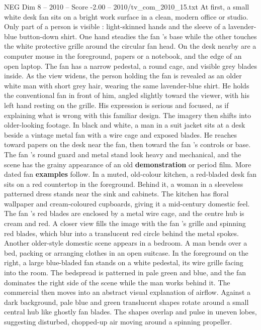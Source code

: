\begin{textsample}{NEG Dim 8 – 2010 – Score -2.00 – 2010/tv\_com\_2010\_15.txt}  \label{ex:f8_neg_075}
At first, a small white desk fan sits on a bright work surface in a clean, modern office or studio.
Only part of a person is visible : light-skinned hands and the sleeve of a lavender-blue button-down shirt.
One hand steadies the fan ’s base while the other touches the white protective grille around the circular fan head.
On the desk nearby are a computer mouse in the foreground, papers or a notebook, and the edge of an open laptop.
The fan has a narrow pedestal, a round cage, and visible grey blades inside.
As the view widens, the person holding the fan is revealed as an older white man with short grey hair, wearing the same lavender-blue shirt.
He holds the conventional fan in front of him, angled slightly toward the viewer, with his left hand resting on the grille.
His expression is serious and focused, as if explaining what is wrong with this familiar design.
The imagery then shifts into older-looking footage.
In black and white, a man in a suit jacket sits at a desk beside a vintage metal fan with a wire cage and exposed blades.
He reaches toward papers on the desk near the fan, then toward the fan ’s controls or base.
The fan ’s round guard and metal stand look heavy and mechanical, and the scene has the grainy appearance of an old \textbf{demonstration} or period film.
More dated fan \textbf{examples} follow.
In a muted, old-colour kitchen, a red-bladed desk fan sits on a red countertop in the foreground.
Behind it, a woman in a sleeveless patterned dress stands near the sink and cabinets.
The kitchen has floral wallpaper and cream-coloured cupboards, giving it a mid-century domestic feel.
The fan ’s red blades are enclosed by a metal wire cage, and the centre hub is cream and red.
A closer view fills the image with the fan ’s grille and spinning red blades, which blur into a translucent red circle behind the metal spokes.
Another older-style domestic scene appears in a bedroom.
A man bends over a bed, packing or arranging clothes in an open suitcase.
In the foreground on the right, a large blue-bladed fan stands on a white pedestal, its wire grille facing into the room.
The bedspread is patterned in pale green and blue, and the fan dominates the right side of the scene while the man works behind it.
The commercial then moves into an abstract visual explanation of airflow.
Against a dark background, pale blue and green translucent shapes rotate around a small central hub like ghostly fan blades.
The shapes overlap and pulse in uneven lobes, suggesting disturbed, chopped-up air moving around a spinning propeller.

\end{textsample}

